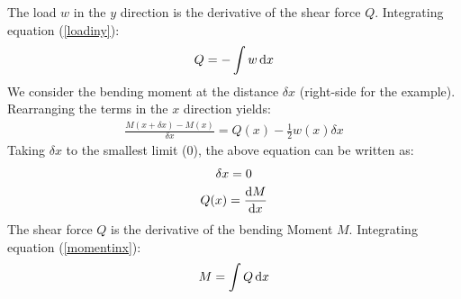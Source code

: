 \documentclass[class=report, crop=false, 12pt,a4paper]{standalone}
\begin{document}
The load $w$ in the $y$ direction is the derivative of the shear force $Q$. Integrating equation (\ref{loadiny}):
\begin{gather}
  Q = -\int w \dif x 
\end{gather}
We consider the bending moment at the distance $\delta x$ (right-side for the example). Rearranging the terms in the $x$ direction yields: 
\begin{gather}
  \frac{M(x+\delta x)-M(x)}{\delta x} = Q(x) - \frac{1}{2}w(x)\delta x
\end{gather}
Taking $\delta x$ to the smallest limit (0), the above equation can be written as:
\begin{gather}
  \delta x = 0 \\
  Q(x) = \frac{\dif M}{\dif x} \\
  \label{momentinx}
\end{gather}
The shear force $Q$ is the derivative of the bending Moment $M$. Integrating equation (\ref{momentinx}):
\begin{gather}
  M = \int Q \dif x 
\end{gather}
\end{document}

